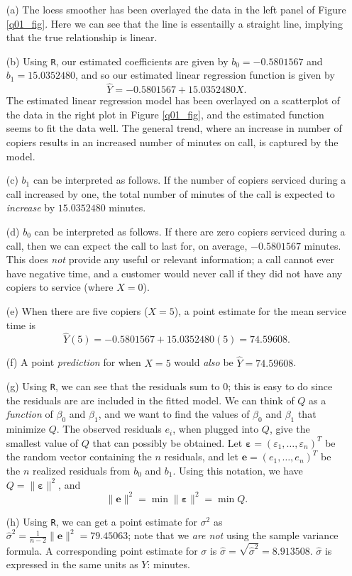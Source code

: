 \documentclass[10pt]{article}
\begin{document}
\begin{itemize}
    \item[(a)] The loess smoother has been overlayed the data in the left panel of Figure \ref{q01_fig}. Here we 
    can see that the line is essentailly a straight line, implying that the true relationship is linear. 
    \item[(b)] Using \texttt{R}, our estimated coefficients are given by \(b_0 = -0.5801567\)
    and \(b_1 = 15.0352480\), and so our estimated linear regression function is given by
    \[\hat{Y} = -0.5801567 + 15.0352480 X.\] The estimated linear regression model has been 
    overlayed on a scatterplot of the data in the right plot in Figure \ref{q01_fig}, and the 
    estimated function seems to fit the data well. The general trend, where an increase in number of 
    copiers results in an increased number of minutes on call, is captured by the model.
    \item[(c)] \(b_1\) can be interpreted as follows. If the number of copiers serviced during
    a call increased by one, the total number of minutes of the call is expected to \textit{increase} by 
    \(15.0352480\) minutes. 
    \item[(d)] \(b_0\) can be interpreted as follows. If there are zero copiers serviced during 
    a call, then we can expect the call to last for, on average, \(-0.5801567 \) minutes. This does \textit{not}
    provide any useful or relevant information; a call cannot ever have negative time, and a customer would never
    call if they did not have any copiers to service (where \(X = 0\)).
    \item[(e)] When there are five copiers (\(X=5\)), a point estimate for the mean service time is 
    \[
        \hat{Y}(5) = -0.5801567 + 15.0352480(5) = 74.59608.
    \]
    \item[(f)] A point \textit{prediction} for when \(X=5\) would \textit{also} be \(\hat{Y} = 74.59608\). 
    \item[(g)] Using \texttt{R}, we can see that the residuals sum to 0; this is easy to do since the residuals are
    are included in the fitted model. We can think of \(Q\) as a \textit{function} 
    of \(\beta_0\) and \(\beta_1\), and we want to find the values of \(\beta_0\) and \(\beta_1\) that minimize \(Q\).
    The observed residuals \(e_i\), when plugged into \(Q\), give the smallest value of \(Q\) that can possibly be obtained. 
    Let \(\bm{\varepsilon} = (\varepsilon_1, \ldots, \varepsilon_n)^T\) be the random vector containing the \(n\) 
    residuals, and let \(\mathbf{e} = (e_1, \ldots, e_n)^T\) be the \(n\) realized residuals from \(b_0\)
    and \(b_1\). Using this 
    notation, we have \(Q = \| \bm{\varepsilon} \|^2\), and \[\| \mathbf{e}\|^2 = \min \|\bm{\varepsilon}\|^2 = \min Q.\]
    \item[(h)] Using \texttt{R}, we can get a point estimate for \(\sigma^2\) as \(\hat{\sigma}^2 = \frac{1}{n-2} \|\mathbf{e}\|^2 = 79.45063\); note that we 
    \textit{are not} using the sample variance formula. A corresponding point estimate for \(\sigma\) is \(\hat{\sigma} = \sqrt{\hat{\sigma}^2} = 8.913508\). 
    \(\hat{\sigma}\) is expressed in the same units as \(Y\): minutes. 


\end{itemize}
\end{document}
